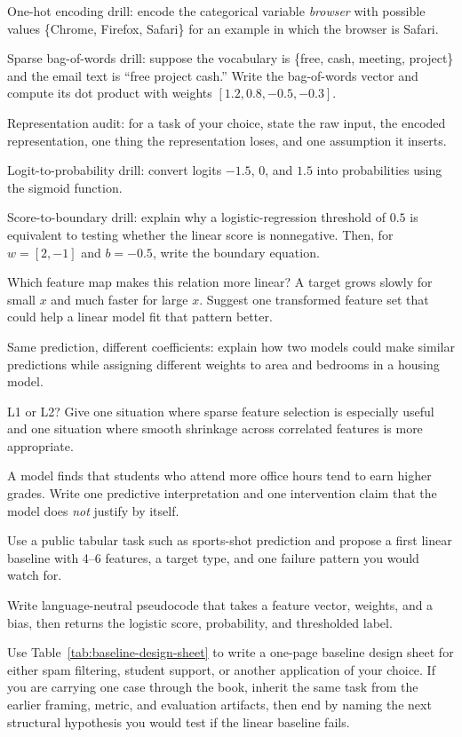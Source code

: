 \begin{exercises}
\item One-hot encoding drill: encode the categorical variable \emph{browser} with possible values \{Chrome, Firefox, Safari\} for an example in which the browser is Safari.
\item Sparse bag-of-words drill: suppose the vocabulary is \{free, cash, meeting, project\} and the email text is ``free project cash.'' Write the bag-of-words vector and compute its dot product with weights $[1.2, 0.8, -0.5, -0.3]$.
\item Representation audit: for a task of your choice, state the raw input, the encoded representation, one thing the representation loses, and one assumption it inserts.
\item Logit-to-probability drill: convert logits $-1.5$, $0$, and $1.5$ into probabilities using the sigmoid function.
\item Score-to-boundary drill: explain why a logistic-regression threshold of $0.5$ is equivalent to testing whether the linear score is nonnegative. Then, for $w=[2,-1]$ and $b=-0.5$, write the boundary equation.
\item Which feature map makes this relation more linear? A target grows slowly for small $x$ and much faster for large $x$. Suggest one transformed feature set that could help a linear model fit that pattern better.
\item Same prediction, different coefficients: explain how two models could make similar predictions while assigning different weights to area and bedrooms in a housing model.
\item L1 or L2? Give one situation where sparse feature selection is especially useful and one situation where smooth shrinkage across correlated features is more appropriate.
\item A model finds that students who attend more office hours tend to earn higher grades. Write one predictive interpretation and one intervention claim that the model does \emph{not} justify by itself.
\item Use a public tabular task such as sports-shot prediction and propose a first linear baseline with 4--6 features, a target type, and one failure pattern you would watch for.
\item Write language-neutral pseudocode that takes a feature vector, weights, and a bias, then returns the logistic score, probability, and thresholded label.
\item Use Table~\ref{tab:baseline-design-sheet} to write a one-page baseline design sheet for either spam filtering, student support, or another application of your choice. If you are carrying one case through the book, inherit the same task from the earlier framing, metric, and evaluation artifacts, then end by naming the next structural hypothesis you would test if the linear baseline fails.
\end{exercises}

